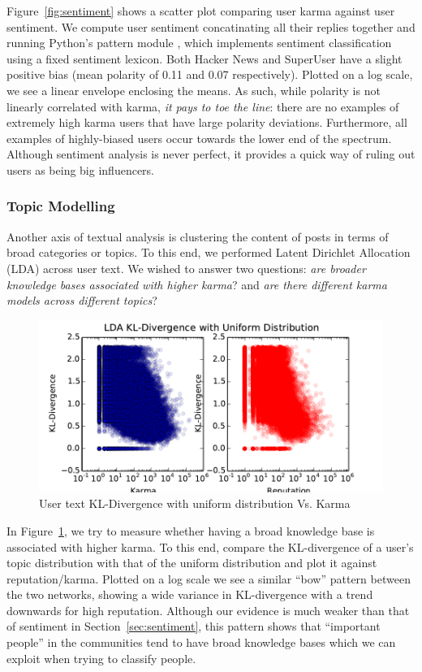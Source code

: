 \documentclass[11pt]{article}
\begin{document}
Figure~\ref{fig:sentiment} shows a scatter plot comparing user karma
against user sentiment. We compute user sentiment concatinating all
their replies together and running Python's pattern module \citet{de2012pattern}, 
which implements sentiment classification using a fixed sentiment lexicon.  Both
Hacker News and SuperUser have a slight positive bias (mean polarity of 0.11 and
0.07 respectively). Plotted on a log scale, we see a linear envelope enclosing
the means. As such, while polarity is not linearly correlated with karma,
\textit{it pays to toe the line}: there are no examples of extremely high karma
users that have large polarity deviations. Furthermore, all examples of
highly-biased users occur towards the lower end of the spectrum. Although
sentiment analysis is never perfect, it provides a quick way of ruling out users
as being big influencers.

\subsubsection{Topic Modelling}

Another axis of textual analysis is clustering the content of posts in terms of
broad categories or topics. To this end, we performed Latent Dirichlet
Allocation (LDA) \cite{blei2003latent} across user text. We wished to answer two
questions: \textit{are broader knowledge bases associated with higher karma}?
and \textit{are there different karma models across different topics}?

\begin{figure}[h]
\centering
\includegraphics[width=\linewidth]{lda_kl}
\caption{User text KL-Divergence with uniform distribution Vs. Karma}
\label{fig:lda_kl}
\end{figure}

In Figure~\ref{fig:lda_kl}, we try to measure whether having a broad knowledge
base is associated with higher karma. To this end, compare the KL-divergence of
a user's topic distribution with that of the uniform distribution and plot it
against reputation/karma. Plotted on a log scale we see a similar ``bow''
pattern between the two networks, showing a wide variance in KL-divergence with
a trend downwards for high reputation. Although our evidence is much weaker than
that of sentiment in Section~\ref{sec:sentiment}, this pattern shows that
``important people'' in the communities tend to have broad knowledge bases which
we can exploit when trying to classify people.
\end{document}
